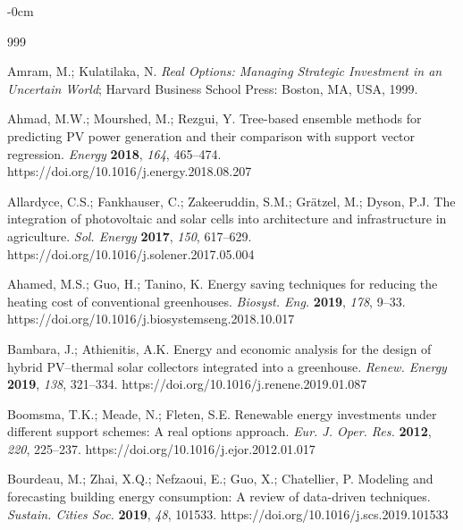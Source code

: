 \documentclass[agriengineering,article,submit,pdftex,moreauthors]{Definitions/mdpi}
\begin{document}

\begin{adjustwidth}{-\extralength}{0cm}
\printendnotes[custom]
\end{adjustwidth}

\begin{thebibliography}{999}

Amram, M.; Kulatilaka, N. \emph{Real Options: Managing Strategic Investment in an Uncertain World}; Harvard Business School Press: Boston, MA, USA, 1999.

Ahmad, M.W.; Mourshed, M.; Rezgui, Y. Tree-based ensemble methods for predicting PV power generation and their comparison with support vector regression. \emph{Energy} \textbf{2018}, \emph{164}, 465--474. https://doi.org/10.1016/j.energy.2018.08.207

Allardyce, C.S.; Fankhauser, C.; Zakeeruddin, S.M.; Gr\"atzel, M.; Dyson, P.J. The integration of photovoltaic and solar cells into architecture and infrastructure in agriculture. \emph{Sol. Energy} \textbf{2017}, \emph{150}, 617--629. https://doi.org/10.1016/j.solener.2017.05.004

Ahamed, M.S.; Guo, H.; Tanino, K. Energy saving techniques for reducing the heating cost of conventional greenhouses. \emph{Biosyst. Eng.} \textbf{2019}, \emph{178}, 9--33. https://doi.org/10.1016/j.biosystemseng.2018.10.017

Bambara, J.; Athienitis, A.K. Energy and economic analysis for the design of hybrid PV--thermal solar collectors integrated into a greenhouse. \emph{Renew. Energy} \textbf{2019}, \emph{138}, 321--334. https://doi.org/10.1016/j.renene.2019.01.087

Boomsma, T.K.; Meade, N.; Fleten, S.E. Renewable energy investments under different support schemes: A real options approach. \emph{Eur. J. Oper. Res.} \textbf{2012}, \emph{220}, 225--237. https://doi.org/10.1016/j.ejor.2012.01.017

Bourdeau, M.; Zhai, X.Q.; Nefzaoui, E.; Guo, X.; Chatellier, P. Modeling and forecasting building energy consumption: A review of data-driven techniques. \emph{Sustain. Cities Soc.} \textbf{2019}, \emph{48}, 101533. https://doi.org/10.1016/j.scs.2019.101533


\end{thebibliography}
\end{document}
